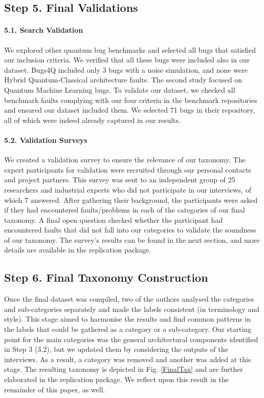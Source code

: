 \subsection*{Step 5. Final Validations}


\paragraph*{5.1. Search Validation}
We explored other quantum bug benchmarks \cite{zhao_bugs4q_2021}\cite{zhao_empirical_2023} and selected all bugs that satisfied our inclusion criteria. We verified that all these bugs were included also in our dataset. Bugs4Q \cite{zhao_bugs4q_2021} included only 3 bugs with a noise simulation, and none were Hybrid Quantum-Classical architecture faults. The second study \cite{zhao_empirical_2023} focused on Quantum Machine Learning bugs. To validate our dataset, we checked all benchmark faults complying with our four criteria in the benchmark repositories and ensured our dataset included them. We selected 71 bugs in their repository, all of which were indeed already captured in our results.  \\


\paragraph*{5.2. Validation Surveys}

We created a validation survey to ensure the relevance of our taxonomy. The expert participants for validation were recruited through our personal contacts and project partners.  This survey was sent to an independent group of 25 researchers and industrial experts who did not participate in our interviews, of which 7 answered. After gathering their background, the participants were asked if they had encountered faults/problems in each of the categories of our final taxonomy. A final open question checked whether the participant had encountered faults that did not fall into our categories to validate the soundness of our taxonomy. The survey's results can be found in the next section, and more details are available in the replication package.


\subsection*{Step 6. Final Taxonomy Construction}
Once the final dataset was compiled, two of the authors analysed the categories and sub-categories separately and made the labels consistent (in terminology and style). This stage aimed to harmonise the results and find common patterns in the labels that could be gathered as a category or a sub-category. Our starting point for the main categories was the general architectural components identified in Step 3 (3.2), but we updated them by considering the outputs of the interviews. 
As a result, a category was removed and another was added at this stage. The resulting taxonomy is depicted in Fig. \ref{FinalTax} and are further elaborated in the replication package. We reflect upon this result in the remainder of this paper, as well. 

